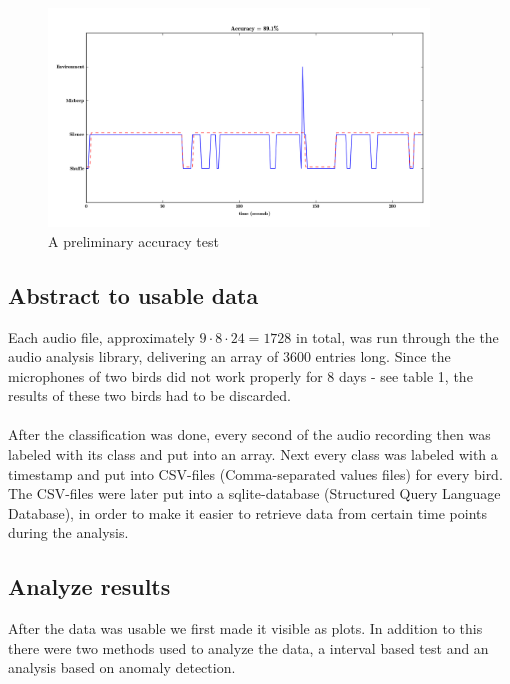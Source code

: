 \documentclass[a4paper]{article}
\begin{document}
\begin{figure}[!ht]
  \centering
    \includegraphics[width=0.9\textwidth]{accuracy_test_crop}
      \caption{A preliminary accuracy test}
\end{figure}


\subsection*{Abstract to usable data}
Each audio file, approximately $9\cdot8\cdot24=1728$ in total, was run through the the audio analysis library, delivering an array of 3600 entries long. Since the microphones of two birds did not work properly for 8 days - see table 1, the results of these two birds had to be discarded. \\ \\ 
After the classification was done, every second of the audio recording then was labeled with its class and put into an array. Next every class was labeled with a timestamp and put into CSV-files (Comma-separated values files) for every bird. The CSV-files were later put into a sqlite-database (Structured Query Language Database), in order to make it easier to retrieve data from certain time points during the analysis.

\subsection*{Analyze results}
After the data was usable we first made it visible as plots. In addition to this there were two methods used to analyze the data, a interval based test and an analysis based on anomaly detection. 

\end{document}
